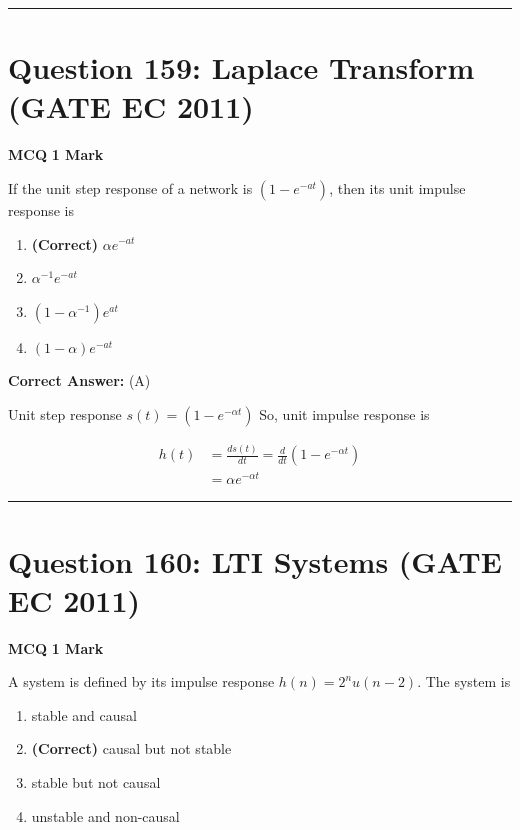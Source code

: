 \documentclass[11pt,a4paper]{article}
\begin{document}
\vspace{1.5em}
\hrule
\vspace{1.5em}

\section*{Question 159: Laplace Transform (GATE EC 2011)}
\noindent \textbf{\color{primary}MCQ} \hfill \textbf{\color{secondary}1 Mark}


\noindent If the unit step response of a network is $(1-e^{-at})$, then its unit impulse response is


\begin{enumerate}[label=(\Alph*)]
    \item \textbf{(Correct)} $\alpha e^{-at}$
    \item $\alpha^{-1} e^{-at}$
    \item $(1-\alpha ^{-1})e^{at}$
    \item $(1-\alpha)e^{-at}$
\end{enumerate}

\noindent \textbf{Correct Answer:} (A)

\begin{tcolorbox}[solbox, title=Detailed Solution -- Question 159]
Unit step response $s(t)=\left(1-e^{-\alpha t}\right)$
 So, unit impulse response is

\[
\begin{aligned} h(t) &=\frac{d s(t)}{d t}=\frac{d}{d t}\left(1-e^{-\alpha t}\right) \\ &=\alpha e^{-\alpha t} \end{aligned}
\]
\end{tcolorbox}

\vspace{1.5em}
\hrule
\vspace{1.5em}

\section*{Question 160: LTI Systems (GATE EC 2011)}
\noindent \textbf{\color{primary}MCQ} \hfill \textbf{\color{secondary}1 Mark}


\noindent A system is defined by its impulse response $h(n) =2^{n} u(n - 2)$. The system is


\begin{enumerate}[label=(\Alph*)]
    \item stable and causal
    \item \textbf{(Correct)} causal but not stable
    \item stable but not causal
    \item unstable and non-causal
\end{enumerate}
\end{document}
